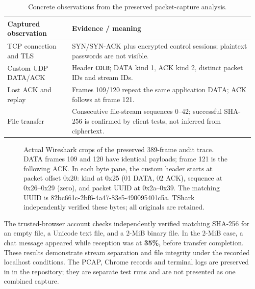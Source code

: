 \begin{table}[H]
\centering\small
\begin{tabularx}{\linewidth}{@{}L{3.6cm}Y@{}}
\toprule
\textbf{Captured observation} & \textbf{Evidence / meaning} \\
\midrule
TCP connection and TLS & SYN/SYN-ACK plus encrypted control sessions; plaintext passwords are not visible. \\
Custom UDP DATA/ACK & Header \texttt{COLB}; DATA kind 1, ACK kind 2, distinct packet IDs and stream IDs. \\
Lost ACK and replay & Frames 109/120 repeat the same application DATA; ACK follows at frame 121. \\
File transfer & Consecutive file-stream sequences 0--42; successful SHA-256 is confirmed by client tests, not inferred from ciphertext. \\
\bottomrule
\end{tabularx}
\caption{Concrete observations from the preserved packet-capture analysis.}
\label{tab:pcap}
\end{table}

\begin{figure}[H]
\centering
{}
\caption{Actual Wireshark crops of the preserved 389-frame audit trace. DATA frames 109 and 120 have identical payloads; frame 121 is the following ACK. In each byte pane, the custom header starts at packet offset 0x20: kind at 0x25 (01 DATA, 02 ACK), sequence at 0x26--0x29 (zero), and packet UUID at 0x2a--0x39. The matching UUID is 82bc661c-2bf6-4a47-83e5-490095401c5a. TShark independently verified these bytes; all originals are retained.}
\label{fig:wireshark-evidence}
\end{figure}

The trusted-browser account checks independently verified matching SHA-256 for an empty file, a Unicode text file, and a 2-MiB binary file. In the 2-MiB case, a chat message appeared while reception was at \textbf{35\%}, before transfer completion. These results demonstrate stream separation and file integrity under the recorded localhost conditions. The PCAP, Chrome records and terminal logs are preserved in  in the repository; they are separate test runs and are not presented as one combined capture.
